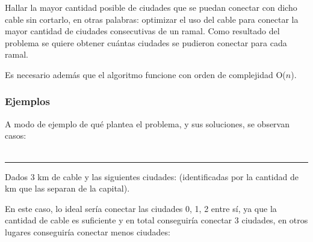 \documentclass[spanish,a4paper]{article}
\begin{document}
Hallar la mayor cantidad posible de ciudades que se puedan conectar con dicho cable sin cortarlo, en otras palabras: optimizar el uso del cable para conectar la mayor cantidad de ciudades consecutivas de un ramal.
Como resultado del problema se quiere obtener cuántas ciudades se pudieron conectar para cada ramal.

Es necesario además que el algoritmo funcione con orden de complejidad O($n$).


\subsubsection{Ejemplos}

A modo de ejemplo de qué plantea el problema, y sus soluciones, se observan casos:\\ \\

\noindent\rule{13cm}{0.4pt}


Dados 3 km de cable y las siguientes ciudades: (identificadas por la cantidad de km que las separan de la capital).\\

\begin{figure}[H]
\end{figure}

En este caso, lo ideal sería conectar las ciudades 0, 1, 2 entre sí, ya que la cantidad de cable es suficiente y en total conseguiría conectar 3 ciudades, en otros lugares conseguiría conectar menos ciudades:\\

\begin{figure}[H]
\end{figure}
\end{document}

